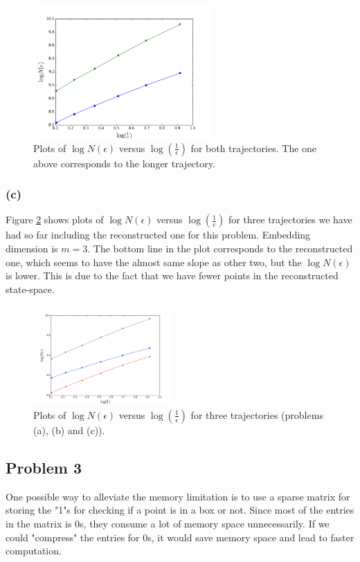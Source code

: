 \documentclass{article}
\begin{document}
\begin{figure}[h]
  \centering
  \includegraphics[height=2in]{figs/q2_b.png}
  \caption{Plots of $\log N(\epsilon)$ versus $\log (\frac{1}{\epsilon})$ for both trajectories. The one above corresponds to the longer trajectory.}
  \label{q2b}
\end{figure}

\subsubsection*{(c)}
Figure \ref{q2c} shows plots of $\log N(\epsilon)$ versus $\log (\frac{1}{\epsilon})$ for three trajectories we have had so far including the reconstructed one for this problem. Embedding dimension is $m = 3$. The bottom line in the plot corresponds to the reconstructed one, which seems to have the almost same slope as other two, but the $\log N(\epsilon)$ is lower. This is due to the fact that we have fewer points in the reconstructed state-space.

\begin{figure}[h]
  \centering
  \includegraphics[height=1.5in]{figs/q2_c.png}
  \caption{Plots of $\log N(\epsilon)$ versus $\log (\frac{1}{\epsilon})$ for three trajectories (problems (a), (b) and (c)).}
  \label{q2c}
\end{figure}

\subsection*{Problem 3}
One possible way to alleviate the memory limitation is to use a sparse matrix for storing the "1"s for checking if a point is in a box or not. Since most of the entries in the matrix is 0s, they consume a lot of memory space unnecessarily. If we could "compress" the entries for 0s, it would save memory space and lead to faster computation.
\end{document}
